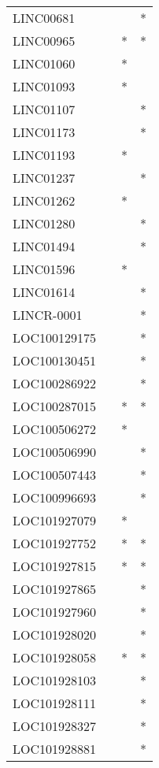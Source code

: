 \begin{longtable}{lccc}
LINC00681      &       &    &       * \\
LINC00965      &       &  * &       * \\
LINC01060      &       &  * &         \\
LINC01093      &       &  * &         \\
LINC01107      &       &    &       * \\
LINC01173      &       &    &       * \\
LINC01193      &       &  * &         \\
LINC01237      &       &    &       * \\
LINC01262      &       &  * &         \\
LINC01280      &       &    &       * \\
LINC01494      &       &    &       * \\
LINC01596      &       &  * &         \\
LINC01614      &       &    &       * \\
LINCR-0001     &       &    &       * \\
LOC100129175   &       &    &       * \\
LOC100130451   &       &    &       * \\
LOC100286922   &       &    &       * \\
LOC100287015   &       &  * &       * \\
LOC100506272   &       &  * &         \\
LOC100506990   &       &    &       * \\
LOC100507443   &       &    &       * \\
LOC100996693   &       &    &       * \\
LOC101927079   &       &  * &         \\
LOC101927752   &       &  * &       * \\
LOC101927815   &       &  * &       * \\
LOC101927865   &       &    &       * \\
LOC101927960   &       &    &       * \\
LOC101928020   &       &    &       * \\
LOC101928058   &       &  * &       * \\
LOC101928103   &       &    &       * \\
LOC101928111   &       &    &       * \\
LOC101928327   &       &    &       * \\
LOC101928881   &       &    &       * \\

\end{longtable}
